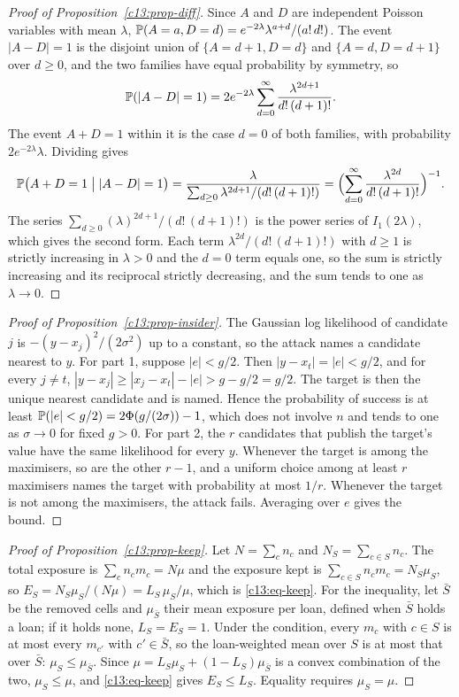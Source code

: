 \begin{proof}[Proof of Proposition~\ref{c13:prop-diff}]
Since $A$ and $D$ are independent Poisson variables with mean $\lambda$,
$\mathbb{P}(A=a, D=d) = e^{-2\lambda}\lambda^{a+d}/(a!\,d!)$. The event $|A-D|=1$ is the
disjoint union of $\{A = d+1, D = d\}$ and $\{A = d, D = d+1\}$ over $d \ge 0$, and the
two families have equal probability by symmetry, so
\[
\mathbb{P}(|A-D|=1) = 2e^{-2\lambda}\sum_{d=0}^{\infty}\frac{\lambda^{2d+1}}{d!\,(d+1)!}.
\]
The event $A+D=1$ within it is the case $d=0$ of both families, with probability
$2e^{-2\lambda}\lambda$. Dividing gives
\[
\mathbb{P}\bigl(A+D=1 \bigm| |A-D|=1\bigr)
= \frac{\lambda}{\sum_{d\ge 0}\lambda^{2d+1}/(d!\,(d+1)!)}
= \Bigl(\sum_{d=0}^{\infty}\frac{\lambda^{2d}}{d!\,(d+1)!}\Bigr)^{-1}.
\]
The series $\sum_{d\ge 0}(\lambda)^{2d+1}/(d!\,(d+1)!)$ is the power series of
$I_1(2\lambda)$, which gives the second form. Each term $\lambda^{2d}/(d!\,(d+1)!)$
with $d \ge 1$ is strictly increasing in $\lambda > 0$ and the $d=0$ term equals one,
so the sum is strictly increasing and its reciprocal strictly decreasing, and the sum
tends to one as $\lambda \to 0$.
\end{proof}

\begin{proof}[Proof of Proposition~\ref{c13:prop-insider}]
The Gaussian log likelihood of candidate $j$ is $-(y-x_j)^2/(2\sigma^2)$ up to a
constant, so the attack names a candidate nearest to $y$. For part 1, suppose
$|e| < g/2$. Then $|y - x_t| = |e| < g/2$, and for every $j \ne t$,
$|y - x_j| \ge |x_j - x_t| - |e| > g - g/2 = g/2$. The target is then the unique
nearest candidate and is named. Hence the probability of success is at least
$\mathbb{P}(|e| < g/2) = 2\Phi(g/(2\sigma)) - 1$, which does not involve $n$ and tends to
one as $\sigma \to 0$ for fixed $g > 0$. For part 2, the $r$ candidates that publish
the target's value have the same likelihood for every $y$. Whenever the target is
among the maximisers, so are the other $r-1$, and a uniform choice among at least $r$
maximisers names the target with probability at most $1/r$. Whenever the target is
not among the maximisers, the attack fails. Averaging over $e$ gives the bound.
\end{proof}

\begin{proof}[Proof of Proposition~\ref{c13:prop-keep}]
Let $N = \sum_c n_c$ and $N_S = \sum_{c \in S} n_c$. The total exposure is
$\sum_c n_c m_c = N\mu$ and the exposure kept is $\sum_{c\in S} n_c m_c = N_S \mu_S$, so
$E_S = N_S\mu_S/(N\mu) = L_S\,\mu_S/\mu$, which is \eqref{c13:eq-keep}. For the
inequality, let $\bar S$ be the removed cells and $\mu_{\bar S}$ their mean exposure
per loan, defined when $\bar S$ holds a loan; if it holds none, $L_S = E_S = 1$. Under
the condition, every $m_c$ with $c \in S$ is at most every $m_{c'}$ with
$c' \in \bar S$, so the loan-weighted mean over $S$ is at most that over $\bar S$:
$\mu_S \le \mu_{\bar S}$. Since $\mu = L_S\mu_S + (1-L_S)\mu_{\bar S}$ is a convex
combination of the two, $\mu_S \le \mu$, and \eqref{c13:eq-keep} gives
$E_S \le L_S$. Equality requires $\mu_S = \mu$.
\end{proof}
